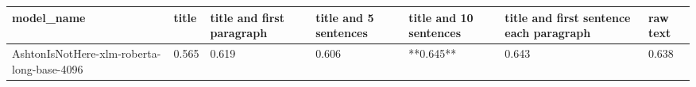 \begin{tabular}{lllllll}
\toprule
                                model\_name & title & title and first paragraph & title and 5 sentences & title and 10 sentences & title and first sentence each paragraph & raw text \\
\midrule
AshtonIsNotHere-xlm-roberta-long-base-4096 & 0.565 &                     0.619 &                 0.606 &              **0.645** &                                   0.643 &    0.638 \\
\bottomrule
\end{tabular}
